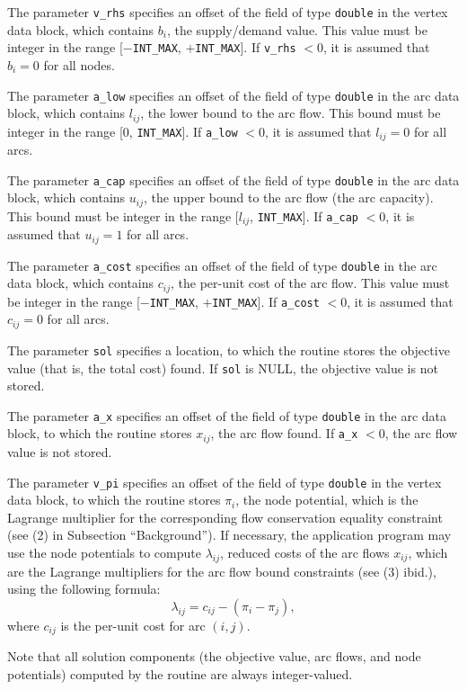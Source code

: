 The parameter \verb|v_rhs| specifies an offset of the field of type
\verb|double| in the vertex data block, which contains $b_i$, the
supply/demand value. This value must be integer in the range
[$-$\verb|INT_MAX|, $+$\verb|INT_MAX|]. If \verb|v_rhs| $<0$, it is
assumed that $b_i=0$ for all nodes.

The parameter \verb|a_low| specifies an offset of the field of type
\verb|double| in the arc data block, which contains $l_{ij}$, the lower
bound to the arc flow. This bound must be integer in the range
[$0$, \verb|INT_MAX|]. If \verb|a_low| $<0$, it is assumed that
$l_{ij}=0$ for all arcs.

The parameter \verb|a_cap| specifies an offset of the field of type
\verb|double| in the arc data block, which contains $u_{ij}$, the upper
bound to the arc flow (the arc capacity). This bound must be integer in
the range [$l_{ij}$, \verb|INT_MAX|]. If \verb|a_cap| $<0$, it is
assumed that $u_{ij}=1$ for all arcs.

The parameter \verb|a_cost| specifies an offset of the field of type
\verb|double| in the arc data block, which contains $c_{ij}$, the
per-unit cost of the arc flow. This value must be integer in the range
[$-$\verb|INT_MAX|, $+$\verb|INT_MAX|]. If \verb|a_cost| $<0$, it is
assumed that $c_{ij}=0$ for all arcs.

The parameter \verb|sol| specifies a location, to which the routine
stores the objective value (that is, the total cost) found. If
\verb|sol| is NULL, the objective value is not stored.

The parameter \verb|a_x| specifies an offset of the field of type
\verb|double| in the arc data block, to which the routine stores
$x_{ij}$, the arc flow found. If \verb|a_x| $<0$, the arc flow value is
not stored.

The parameter \verb|v_pi| specifies an offset of the field of type
\verb|double| in the vertex data block, to which the routine stores
$\pi_i$, the node potential, which is the Lagrange multiplier for the
corresponding flow conservation equality constraint (see (2) in
Subsection ``Background''). If necessary, the application program may
use the node potentials to compute $\lambda_{ij}$, reduced costs of the
arc flows $x_{ij}$, which are the Lagrange multipliers for the arc flow
bound constraints (see (3) ibid.), using the following formula:
$$\lambda_{ij}=c_{ij}-(\pi_i-\pi_j),$$
where $c_{ij}$ is the per-unit cost for arc $(i,j)$.

Note that all solution components (the objective value, arc flows, and
node potentials) computed by the routine are always integer-valued.

